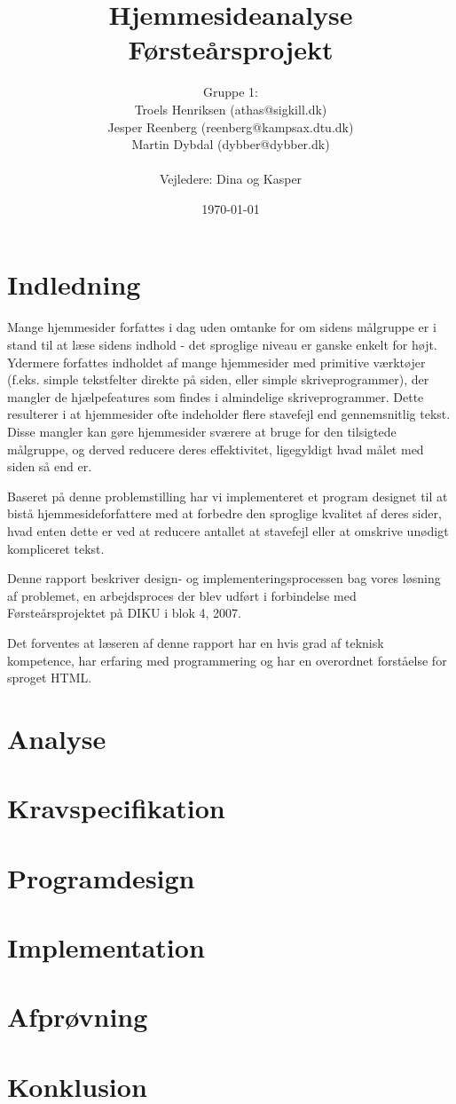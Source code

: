 \documentclass[a4paper,oneside,article]{memoir}
\title{Hjemmesideanalyse  \\ \small{Førsteårsprojekt}}
\author
{
  Gruppe 1:\\
  Troels Henriksen (athas@sigkill.dk)\\
  Jesper Reenberg (reenberg@kampsax.dtu.dk)\\
  Martin Dybdal (dybber@dybber.dk)\\ \\
  Vejledere: Dina og Kasper
}
\date{\today}
\begin{document}
\maketitle
\newpage
\tableofcontents*
\newpage

\chapter{Indledning}

Mange hjemmesider forfattes i dag uden omtanke for om sidens målgruppe
er i stand til at læse sidens indhold - det sproglige niveau er ganske
enkelt for højt. Ydermere forfattes indholdet af mange hjemmesider med
primitive værktøjer (f.eks. simple tekstfelter direkte på siden, eller
simple skriveprogrammer), der mangler de hjælpefeatures som findes i
almindelige skriveprogrammer. Dette resulterer i at hjemmesider ofte
indeholder flere stavefejl end gennemsnitlig tekst. Disse mangler kan
gøre hjemmesider sværere at bruge for den tilsigtede målgruppe, og
derved reducere deres effektivitet, ligegyldigt hvad målet med siden
så end er.

Baseret på denne problemstilling har vi implementeret et program
designet til at bistå hjemmesideforfattere med at forbedre den
sproglige kvalitet af deres sider, hvad enten dette er ved at reducere
antallet at stavefejl eller at omskrive unødigt kompliceret tekst.

Denne rapport beskriver design- og implementeringsprocessen bag vores
løsning af problemet, en arbejdsproces der blev udført i forbindelse
med Førsteårsprojektet på DIKU i blok 4, 2007.

Det forventes at læseren af denne rapport har en hvis grad af teknisk
kompetence, har erfaring med programmering og har en overordnet
forståelse for sproget HTML.

\chapter{Analyse}

\chapter{Kravspecifikation}

\chapter{Programdesign}

\chapter{Implementation}

\chapter{Afprøvning}

\chapter{Konklusion}
\end{document}
